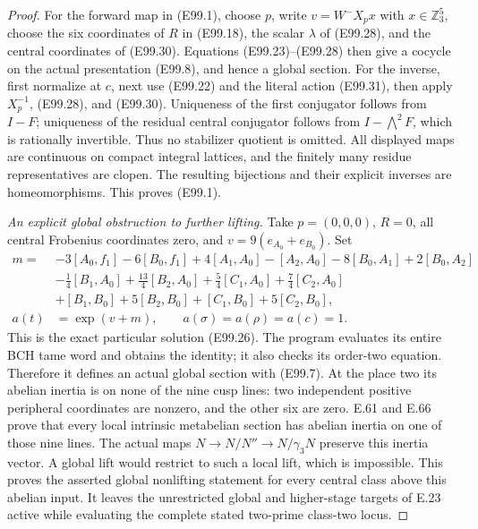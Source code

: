 \begin{proof}
For the forward map in (E99.1), choose $p$, write
$v=W^-X_p x$ with $x\in\mathbb Z_3^5$, choose the six
coordinates of $R$ in (E99.18), the scalar $\lambda$ of
(E99.28), and the central coordinates of (E99.30).
Equations (E99.23)--(E99.28) then give a cocycle on the
actual presentation (E99.8), and hence a global section.
For the inverse, first normalize at $c$, next use
(E99.22) and the literal action (E99.31), then apply
$X_p^{-1}$, (E99.28), and (E99.30).
Uniqueness of the first conjugator follows from $I-F$;
uniqueness of the residual central conjugator follows
from $I-\bigwedge^2F$, which is rationally invertible.
Thus no stabilizer quotient is omitted. All displayed
maps are continuous on compact integral lattices, and
the finitely many residue representatives are clopen.
The resulting bijections and their explicit inverses
are homeomorphisms. This proves (E99.1).

\emph{An explicit global obstruction to further lifting.}
Take $p=(0,0,0)$, $R=0$, all central Frobenius coordinates
zero, and
$v=9(e_{A_0}+e_{B_0})$. Set
\[
 \begin{split}
 m={}&-3[A_0,f_1]-6[B_0,f_1]
       +4[A_1,A_0]-[A_2,A_0]
       -8[B_0,A_1]+2[B_0,A_2]\\
   &-\tfrac14[B_1,A_0]+\tfrac{13}4[B_2,A_0]
       +\tfrac54[C_1,A_0]+\tfrac74[C_2,A_0]\\
   &+[B_1,B_0]+5[B_2,B_0]+[C_1,B_0]+5[C_2,B_0],\\
 a(t)&=\exp(v+m),\qquad
 a(\sigma)=a(\rho)=a(c)=1.
 \end{split}                                               \tag{E99.32}
\]
This is the exact particular solution (E99.26). The program
evaluates its entire BCH tame word and obtains the identity;
it also checks its order-two equation. Therefore it defines
an actual global section with (E99.7).
At the place two its abelian inertia is on none of the
nine cusp lines: two independent positive peripheral
coordinates are nonzero, and the other six are zero.
E.61 and E.66 prove that every local intrinsic metabelian
section has abelian inertia on one of those nine lines.
The actual maps
$N\to N/N''\to N/\gamma_3N$ preserve this inertia vector.
A global lift would restrict to such a local lift, which
is impossible. This proves the asserted global nonlifting
statement for every central class above this abelian input.
It leaves the unrestricted global and higher-stage targets
of E.23 active while evaluating the complete stated
two-prime class-two locus.
\end{proof}
